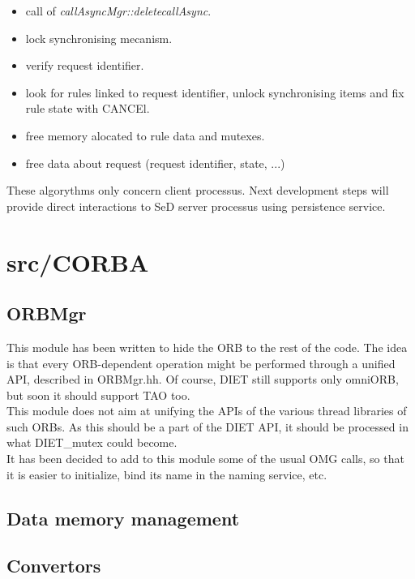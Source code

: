   \begin{itemize}
  \item call of \emph{callAsyncMgr::deletecallAsync}.
  \item lock synchronising mecanism.
  \item verify request identifier.
  \item look for rules linked to request identifier, 
  unlock synchronising items and fix rule state with CANCEl.
  \item free memory alocated to rule data and mutexes.
\item free data about request (request identifier, state, ...)
  \end{itemize}

  \noindent
   These algorythms only concern client processus. Next development steps
  will provide direct interactions to SeD server processus using persistence
  service. 

  \section{\textsf{src/CORBA}}
  \label{s:CORBA}

  \subsection{\textsf{ORBMgr}}

  This module has been written to hide the ORB to the rest of the code. The idea
  is that every ORB-dependent operation might be performed through a unified API,
  described in \textsf{ORBMgr.hh}. Of course, DIET still supports only omniORB,
  but soon it should support TAO too.
  \\
  This module does not aim at unifying the APIs of the various thread libraries of
  such ORBs. As this should be a part of the DIET API, it should be processed in
  what \textsf{DIET\_mutex} could become.
  \\
  It has been decided to add to this module some of the usual OMG calls, so that
  it is easier to initialize, bind its name in the naming service, etc.


  \subsection{Data memory management}



  \subsection{Convertors}

